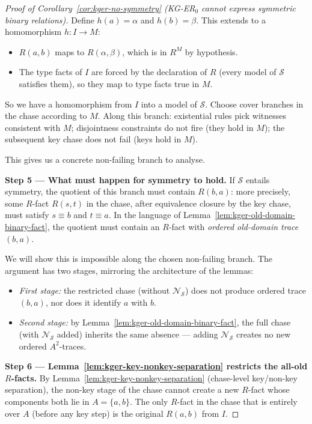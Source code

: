 \documentclass[10pt]{article}
\begin{document}
\begin{proof}[Proof of Corollary~\ref{cor:kger-no-symmetry} (KG-ER$_0$ cannot express symmetric binary relations)]
Define \(h(a)=\alpha\) and \(h(b)=\beta\).  This extends to a
homomorphism \(h:I\to M\):
\begin{itemize}
\item \(R(a,b)\) maps to \(R(\alpha,\beta)\), which is in \(R^M\) by
hypothesis.
\item The type facts of \(I\) are forced by the declaration of \(R\)
(every model of \(\mathcal S\) satisfies them), so they map to type
facts true in \(M\).
\end{itemize}
So we have a homomorphism from \(I\) into a model of \(\mathcal S\).
Choose cover branches in the chase according to \(M\).  Along this
branch: existential rules pick witnesses consistent with \(M\);
disjointness constraints do not fire (they hold in \(M\)); the
subsequent key chase does not fail (keys hold in \(M\)).

This gives us a concrete non-failing branch to analyse.

\smallskip\noindent\textbf{Step 5 --- What must happen for symmetry to
hold.}
If \(\mathcal S\) entails symmetry, the quotient of this branch must
contain \(R(b,a)\): more precisely, some \(R\)-fact \(R(s,t)\) in the
chase, after equivalence closure by the key chase, must satisfy
\(s\equiv b\) and \(t\equiv a\).  In the language of
Lemma~\ref{lem:kger-old-domain-binary-fact}, the quotient must contain
an \(R\)-fact with \emph{ordered old-domain trace \((b,a)\)}.

We will show this is impossible along the chosen non-failing branch.
The argument has two stages, mirroring the architecture of the
lemmas:
\begin{itemize}
\item \emph{First stage:} the restricted chase (without
\(\mathcal N_{\mathcal S}\)) does not produce ordered trace \((b,a)\),
nor does it identify \(a\) with \(b\).
\item \emph{Second stage:} by
Lemma~\ref{lem:kger-old-domain-binary-fact}, the full chase (with
\(\mathcal N_{\mathcal S}\) added) inherits the same absence ---
adding \(\mathcal N_{\mathcal S}\) creates no new ordered
\(A^2\)-traces.
\end{itemize}

\smallskip\noindent\textbf{Step 6 ---
Lemma~\ref{lem:kger-key-nonkey-separation} restricts the all-old
\(R\)-facts.}
By Lemma~\ref{lem:kger-key-nonkey-separation} (chase-level key/non-key
separation), the non-key stage of the chase cannot create a new
\(R\)-fact whose components both lie in \(A=\{a,b\}\).  The only
\(R\)-fact in the chase that is entirely over \(A\) (before any key
step) is the original \(R(a,b)\) from \(I\).


\end{proof}
\end{document}
